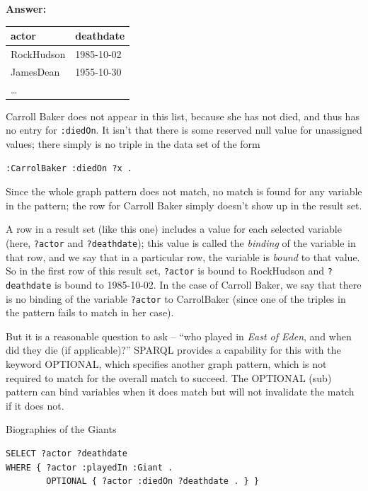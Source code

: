 \textbf{\textbf{Answer:}}

\begin{tabular}{|ll|}
\hline
actor&deathdate\\
\hline
RockHudson&1985-10-02\\
JamesDean&1955-10-30\\
\ldots\\
\hline
\end{tabular}


Carroll Baker does not appear in this list, because she has not died,
and thus has no entry for \texttt{:diedOn}. It isn't that there is some reserved
null value for unassigned values; there simply is no triple in the data
set of the form

\begin{lstlisting}
:CarrolBaker :diedOn ?x .
\end{lstlisting}

Since the whole graph pattern does not match, no match is found for any
variable in the pattern; the row for Carroll Baker simply doesn't show
up in the result set.

A row in a result set (like this one) includes a value for each selected
variable (here, \texttt{?actor} and \texttt{?deathdate}); this value is called the
\emph{binding} of the variable in that row, and we say that in a
particular row, the variable is \emph{bound} to that value. So in the
first row of this result set, \texttt{?actor} is bound to RockHudson and
\texttt{?deathdate} is bound to 1985-10-02. In the case of Carroll Baker, we say
that there is no binding of the variable \texttt{?actor} to CarrolBaker (since
one of the triples in the pattern fails to match in her case).

But it is a reasonable question to ask -- ``who played in \emph{East of
Eden}, and when did they die (if applicable)?'' SPARQL provides a
capability for this with the keyword OPTIONAL, which specifies another
graph pattern, which is not required to match for the overall match to
succeed. The OPTIONAL (sub) pattern can bind variables when it does
match but will not invalidate the match if it does not.

\begin{query}Biographies of the Giants\end{query}

\begin{lstlisting}
SELECT ?actor ?deathdate
WHERE { ?actor :playedIn :Giant .
        OPTIONAL { ?actor :diedOn ?deathdate . } }
\end{lstlisting}

